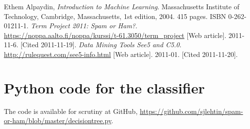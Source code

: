\documentclass[a4paper,10pt]{article}
\begin{document}
\pagebreak
\begin{thebibliography}{9}
  Ethem Alpaydin,
  \emph{Introduction to Machine Learning}.
  Massachusetts Institute of Technology, Cambridge, Massachusetts,
  1st edition,
  2004. 415 pages. ISBN 0-262-01211-1.
  \emph{Term Project 2011: Spam or Ham?}.
  \href{https://noppa.aalto.fi/noppa/kurssi/t-61.3050/term\_project}
  {https://noppa.aalto.fi/noppa/kurssi/t-61.3050/term\_project}
  [Web article]. 2011-11-6. [Cited 2011-11-19].
  \emph{Data Mining Tools See5 and C5.0}.
  \href{http://rulequest.com/see5-info.html}
  {http://rulequest.com/see5-info.html}
  [Web article]. 2011-01. [Cited 2011-11-20].

\end{thebibliography}

\appendix
\section{Python code for the classifier}

The code is available for scrutiny at GitHub,
\href{https://github.com/sjlehtin/spam-or-ham/blob/master/decisiontree.py}
{https://github.com/sjlehtin/spam-or-ham/blob/master/decisiontree.py}.

% 
%
\end{document}
